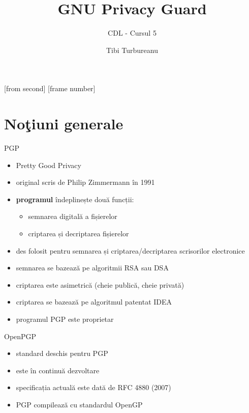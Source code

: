 \documentclass{beamer}
\title[GNU Privacy Guard]{GNU Privacy Guard}
\subtitle{CDL - Cursul 5}
\institute{Ceata}
\author{Tibi Turbureanu}
\begin{document}
[from second]
[frame number]

\frame{\titlepage}

\frame{\tableofcontents}

\section{No\c{t}iuni generale}

\frame{\tableofcontents[currentsection]}

\begin{frame}{PGP}
  \begin{itemize}
    \item Pretty Good Privacy
    \item original scris de Philip Zimmermann în 1991
    \item \textbf{programul} îndeplinește două funcții: 
    \begin{itemize}
      \item semnarea digitală a fișierelor
      \item criptarea și decriptarea fișierelor
    \end{itemize} 
    \item des folosit pentru semnarea și criptarea/decriptarea scrisorilor
    electronice
    \item semnarea se bazează pe algoritmii RSA sau DSA
    \item criptarea este asimetrică (cheie publică, cheie privată)
    \item criptarea se bazează pe algoritmul patentat IDEA
    \item programul PGP este proprietar
  \end{itemize}
\end{frame}

\begin{frame}{OpenPGP}
  \begin{itemize}
    \item standard deschis pentru PGP
    \item este în continuă dezvoltare
    \item specificația actuală este dată de RFC 4880 (2007)
    \item PGP compilează cu standardul OpenGP
  \end{itemize}
\end{frame}
\end{document}
